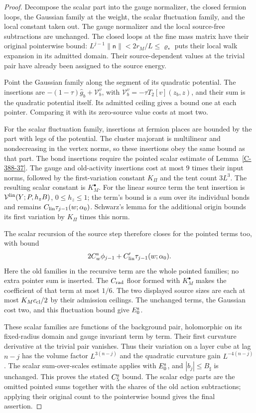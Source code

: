 \documentclass[11pt,letterpaper,reqno]{amsart}
\theoremstyle{definition}
\theoremstyle{remark}
\begin{document}
\begin{proof}
Decompose the scalar part into the gauge normalizer, the closed
fermion loops, the Gaussian family at the weight, the scalar
fluctuation family, and the local constant taken out. The gauge
normalizer and the local source-free subtractions are unchanged.
The closed loops at the fine mass matrix have their original
pointerwise bound: $L^{j-1}\|\mathsf n\|<2r_M/L\le\varrho_*$
puts their local walk expansion in its admitted domain. Their
source-dependent values at the trivial pair have already been
assigned to the source energy.

Point the Gaussian family along the segment of its quadratic
potential. The insertions are
$-(1-\tau)\hat g_b+\mathcal V_b^v$, with
$\mathcal V_b^v=-\tau T_2[v](z_b,z)$, and their sum is the
quadratic potential itself. Its admitted ceiling gives a bound
one at each pointer. Comparing it with its zero-source value
costs at most two.

For the scalar fluctuation family, insertions at fermion places
are bounded by the part with legs of the potential. The cluster
majorant is multilinear and nondecreasing in the vertex norms,
so these insertions obey the same bound as that part. The bond
insertions require the pointed scalar estimate of
Lemma~\ref{C-388-37}. The gauge and old-activity insertions cost
at most $9$ times their input norms, followed by the first-variation
constant $K_\Pi$ and the tent count $3L^3$. The resulting scalar
constant is $K_M^\bullet$. For the linear source term the tent
insertion is $\mathcal V^{\rm lin}(Y;P,h_zB)$, $0\le h_z\le1$;
the term's bound is a sum over its individual bonds and remains
$C_{\rm lin}\tau_{j-1}(w;\alpha_0)$. Schwarz's lemma for the
additional origin bounds its first variation by $K_\Pi$ times
this norm.

The scalar recursion of the source step therefore closes for
the pointed terms too, with bound
\[
 2C_w^{\rm s}\phi_{j-1}
      +C'_{\rm lin}\tau_{j-1}(w;\alpha_0).
\]
Here the old families in the recursive term are the whole
pointed families; no extra pointer sum is inserted. The
$C_{\rm rad}$ floor formed with $K_M^\bullet$ makes the
coefficient of that term at most $1/6$. The two displayed
source sizes are each at most $K_Mc_{\rm cl}/2$ by their
admission ceilings. The unchanged terms, the Gaussian cost
two, and this fluctuation bound give $E_0^{\rm s}$.

These scalar families are functions of the background pair,
holomorphic on its fixed-radius domain and gauge invariant
term by term. Their first curvature derivative at the trivial
pair vanishes. Thus their variation on a layer cube at lag
$n-j$ has the volume factor $L^{3(n-j)}$ and the quadratic
curvature gain $L^{-4(n-j)}$. The scalar sum-over-scales
estimate applies with $E_0^{\rm s}$, and $|b_j|\le B_\sharp$
is unchanged. This proves the stated $C_5^{\rm s}$ bound.
The scalar edge parts are the omitted pointed sums together
with the shares of the old action subtractions; applying their
original count to the pointerwise bound gives the final assertion.
\end{proof}
\end{document}
